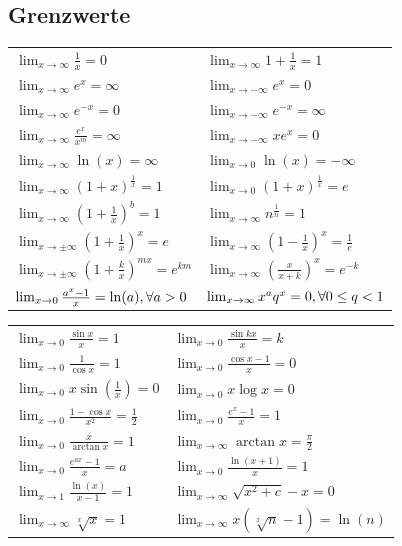 \documentclass[a4paper,10pt]{article}
\def\limxo{\lim_{x\to 0}}
\def\limxi{\lim_{x\to\infty}}
\def\limxn{\lim_{x\to-\infty}}
\begin{document}
\subsection{Grenzwerte}
\begin{center}
  \begin{tabularx}{\linewidth}{XX}
    \toprule
    $\limxi \frac{1}{x} = 0$ & $\limxi 1 + \frac{1}{x} = 1$ \\
    $\limxi e^x = \infty$ & $\limxn e^x = 0$ \\
    $\limxi e^{-x} = 0$ & $\limxn e^{-x} = \infty$ \\
    $\limxi \frac{e^x}{x^m} = \infty$ & $\limxn xe^x = 0$ \\
    $\limxi \ln(x) = \infty$ & $\limxo \ln(x) = -\infty$ \\
    $\limxi (1+x)^{\frac{1}{x}} = 1$ & $\limxo (1+x)^{\frac{1}{x}} = e$ \\
    $\limxi (1+\frac{1}{x})^b = 1$ & $\limxi n^{\frac{1}{n}} = 1$ \\
    $\lim_{x\to\pm\infty} (1 + \frac{1}{x})^x = e$ & $\limxi (1-\frac{1}{x})^x = \frac{1}{e}$ \\
    $\lim_{x\to\pm\infty} (1 + \frac{k}{x})^{mx} = e^{km}$ & $\limxi (\frac{x}{x+k})^x = e^{-k}$ \\
    $\limxo \frac{a^x -1}{x} = \ln(a), \newline \forall a > 0$ &
    $\limxi x^a q^x = 0, \newline \forall 0 \le q < 1$ \\
  \end{tabularx}
  \begin{tabularx}{\linewidth}{XX}
    $\limxo \frac{\sin x}{x} = 1$ & $\limxo \frac{\sin kx}{x} = k$\\
    $\limxo \frac{1}{\cos x} = 1$ & $\limxo \frac{\cos x -1}{x} = 0$ \\
    $\limxo x \sin(\frac{1}{x}) = 0$ & $\limxo x \log x = 0$\\
    $\limxo \frac{1 - \cos x}{x^2} = \frac{1}{2}$ & $\limxo \frac{e^x-1}{x} = 1$ \\
    $\limxo \frac{x}{\arctan x} = 1$ & $\limxi \arctan x = \frac{\pi}{2}$ \\
    $\limxo \frac{e^{ax}-1}{x} = a$ & $\limxo \frac{\ln(x+1)}{x} = 1$ \\
    $\lim_{x\to 1} \frac{\ln(x)}{x-1} = 1$ & $\limxi \sqrt{x^2 + c} - x = 0$ \\
    $\limxi \sqrt[x]{x} = 1$ & $\limxi x(\sqrt[x]{n} - 1) = \ln(n)$ \\
    \bottomrule
  \end{tabularx}
\end{center}
\end{document}
